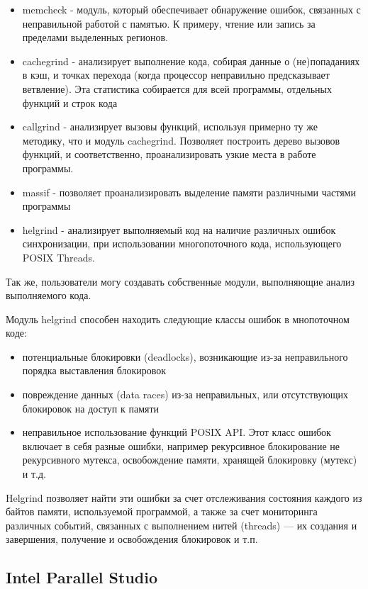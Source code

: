 \begin{itemize}  
\item memcheck - модуль, который обеспечивает обнаружение ошибок, связанных с неправильной работой с памятью. К примеру, чтение или запись за пределами выделенных регионов.
\item cachegrind - анализирует выполнение кода, собирая данные о (не)попаданиях в кэш, и точках перехода (когда процессор неправильно предсказывает ветвление). Эта статистика собирается для всей программы, отдельных функций и строк кода
\item callgrind - анализирует вызовы функций, используя примерно ту же методику, что и модуль cachegrind. Позволяет построить дерево вызовов функций, и соответственно, проанализировать узкие места в работе программы.
\item massif - позволяет проанализировать выделение памяти различными частями программы
\item helgrind - анализирует выполняемый код на наличие различных ошибок синхронизации, при использовании многопоточного кода, использующего POSIX Threads.
\end{itemize}

Так же, пользователи могу создавать собственные модули, выполняющие анализ выполняемого кода.

Модуль helgrind способен находить следующие классы ошибок в мнопоточном коде:

\begin{itemize}  
\item потенциальные блокировки (deadlocks), возникающие из-за неправильного порядка выставления блокировок
\item повреждение данных (data races) из-за неправильных, или отсутствующих блокировок на доступ к памяти
\item неправильное использование функций POSIX API. Этот класс ошибок включает в себя разные ошибки, например рекурсивное блокирование не рекурсивного мутекса, освобождение памяти, хранящей блокировку (мутекс) и т.д.
\end{itemize}

Helgrind \cite{nethercote_seward_2007} позволяет найти эти ошибки за счет отслеживания состояния каждого из байтов памяти, используемой программой, а также за счет мониторинга различных событий, связанных с выполнением нитей (threads) — их создания и завершения, получение и освобождения блокировок и т.п.

\subsection{Intel Parallel Studio}

